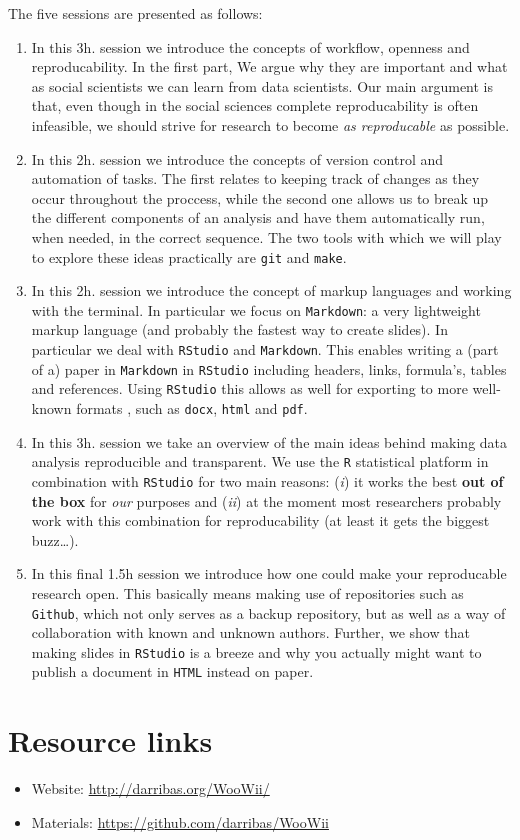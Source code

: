 \documentclass[scrartcl,a4paper,utopia,10pt]{article}
\begin{document}
The five sessions are presented as follows:
\begin{enumerate}
\item In this 3h. session we introduce the concepts of workflow, openness and reproducability. In the first part, We argue why they are important and what as social scientists we can learn from data scientists. Our main argument is that, even though in the social sciences complete reproducability is often infeasible, we should strive for research to become \emph{as reproducable} as possible.
\item In this 2h. session we introduce the concepts of version control and automation of tasks. The first relates to keeping track of changes as they occur throughout the proccess, while the second one allows us to break up the different components of an analysis and have them automatically run, when needed, in the correct sequence. The two tools with which we will play to explore these ideas practically are \texttt{git} and \texttt{make}.
\item In this 2h. session we introduce the concept of markup languages and working with the terminal. In particular we focus on \texttt{Markdown}: a very lightweight markup language (and probably the fastest way to create slides). In particular we deal with \texttt{RStudio} and \texttt{Markdown}. This enables writing a (part of a) paper in \texttt{Markdown} in \texttt{RStudio} including headers, links, formula's, tables and references. Using \texttt{RStudio} this allows as well for exporting to more well-known formats , such as \texttt{docx}, \texttt{html} and \texttt{pdf}.
\item In this 3h. session we take an overview of the main ideas behind making data analysis reproducible and transparent. We use the \texttt{R} statistical platform in combination with \texttt{RStudio} for two main reasons: (\emph{i}) it works the best \textbf{out of the box} for \emph{our} purposes and (\emph{ii}) at the moment most researchers probably work with this combination for reproducability (at least it gets the biggest buzz\ldots{}).
\item In this final 1.5h session we introduce how one could make your reproducable research open. This basically means making use of repositories such as \texttt{Github}, which not only serves as a backup repository, but as well as a way of collaboration with known and unknown authors. Further, we show that making slides in \texttt{RStudio} is a breeze and why you actually might want to publish a document in \texttt{HTML} instead on paper.
\end{enumerate}
\section{Resource links}
\label{sec-3}

\begin{itemize}
\item Website: \href{http://darribas.org/WooWii/}{http://darribas.org/WooWii/}
\item Materials: \href{https://github.com/darribas/WooWii}{https://github.com/darribas/WooWii}
\end{itemize}
\end{document}
